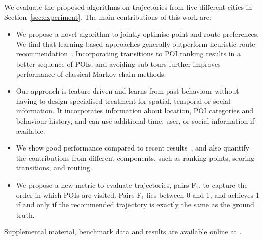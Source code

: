 We evaluate the proposed algorithms on trajectories from five different cities in Section~\ref{sec:experiment}.
The main contributions of this work are:
\begin{itemize}
\setlength{\itemsep}{-2pt}
\item We propose a novel algorithm to jointly optimise point and route preferences. We find that learning-based approaches generally outperform heuristic route recommendation~\cite{ijcai15}.
Incorporating transitions to POI ranking results in a better sequence of POIs, and avoiding sub-tours further improves performance of classical Markov chain methods.
\item Our approach is feature-driven and learns from past behaviour without having to design specialised treatment for spatial, temporal or social information. It incorporates information about location, POI categories and behaviour history, and can use additional time, user, or social information if available.
\item We show good performance compared to recent results~\cite{ijcai15}, and also quantify the contributions from different components, such as ranking points, scoring transitions, and routing.
\item We propose a new metric to evaluate trajectories, pairs-F$_1$, to capture the order in which POIs are visited. Pairs-F$_1$ lies between 0 and 1, and achieves 1 if and only if the recommended trajectory is exactly the same as the ground truth.
\end{itemize}
Supplemental material, benchmark data and results are available online at .

